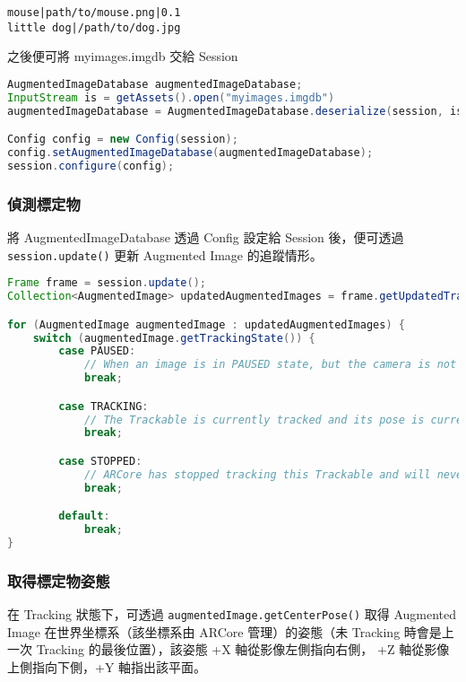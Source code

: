 \begin{lstlisting}[caption=image\_list\_file.txt 範例]
mouse|path/to/mouse.png|0.1
little dog|/path/to/dog.jpg
\end{lstlisting}

之後便可將 myimages.imgdb 交給 Session

\begin{lstlisting}[language=Java, caption=將 myimages.imgdb 交給 Session]
AugmentedImageDatabase augmentedImageDatabase;
InputStream is = getAssets().open("myimages.imgdb")
augmentedImageDatabase = AugmentedImageDatabase.deserialize(session, is);

Config config = new Config(session);
config.setAugmentedImageDatabase(augmentedImageDatabase);
session.configure(config);
\end{lstlisting}

\subsubsection{偵測標定物}
將 AugmentedImageDatabase 透過 Config 設定給 Session 後，便可透過 \lstinline{session.update()} 更新 Augmented Image 的追蹤情形。

\begin{lstlisting}[language=Java, caption=取得影像追蹤狀態]
Frame frame = session.update();
Collection<AugmentedImage> updatedAugmentedImages = frame.getUpdatedTrackables(AugmentedImage.class);

for (AugmentedImage augmentedImage : updatedAugmentedImages) {
    switch (augmentedImage.getTrackingState()) {
        case PAUSED:
            // When an image is in PAUSED state, but the camera is not PAUSED, it has been detected, but not yet tracked.
            break;

        case TRACKING:
            // The Trackable is currently tracked and its pose is current.
            break;

        case STOPPED:
            // ARCore has stopped tracking this Trackable and will never resume tracking it.
            break;

        default:
            break;
}
\end{lstlisting}

\subsubsection{取得標定物姿態}

在 Tracking 狀態下，可透過 \lstinline{augmentedImage.getCenterPose()} 取得 Augmented Image 在世界坐標系（該坐標系由 ARCore 管理）的姿態（未 Tracking 時會是上一次 Tracking 的最後位置），該姿態 +X 軸從影像左側指向右側， +Z 軸從影像上側指向下側，+Y 軸指出該平面。

